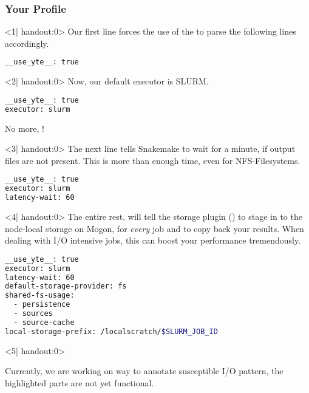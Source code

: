 \begin{frame}[fragile]
  \frametitle{Your Profile}
    \begin{onlyenv}<1| handout:0>
      Our first line forces the use of the  to parse the following lines accordingly.
      \begin{lstlisting}[language=Bash, style=Shell]
__use_yte__: true  	 
      \end{lstlisting}
    \end{onlyenv}
    \begin{onlyenv}<2| handout:0>
      Now, our default executor is SLURM.
      \begin{lstlisting}[language=Bash, style=Shell]
__use_yte__: true
executor: slurm
     \end{lstlisting}
     No more, !
   \end{onlyenv}
   \begin{onlyenv}<3| handout:0>
   	 The next line tells Snakemake to wait for a minute, if output files are not present. This is more than enough time, even for NFS-Filesystems. 
   	 \begin{lstlisting}[language=Bash, style=Shell]
__use_yte__: true
executor: slurm
latency-wait: 60
   	 \end{lstlisting}
    \end{onlyenv}
    \begin{onlyenv}<4| handout:0>
      The entire rest, will tell the storage plugin () to stage in to the node-local storage on Mogon, for \emph{every} job and to copy back your results. When dealing with I/O intensive jobs, this can boost your performance tremendously. 
      \begin{lstlisting}[language=Bash, style=Shell]
__use_yte__: true
executor: slurm
latency-wait: 60
default-storage-provider: fs
shared-fs-usage:
  - persistence
  - sources
  - source-cache
local-storage-prefix: /localscratch/$SLURM_JOB_ID
    \end{lstlisting}
   \end{onlyenv}
  \begin{onlyenv}<5| handout:0>
  	\begin{warning}
  	  Currently, we are working on way to annotate susceptible I/O pattern, the highlighted parts are not yet functional.

\end{warning}
\end{onlyenv}
\end{frame}
